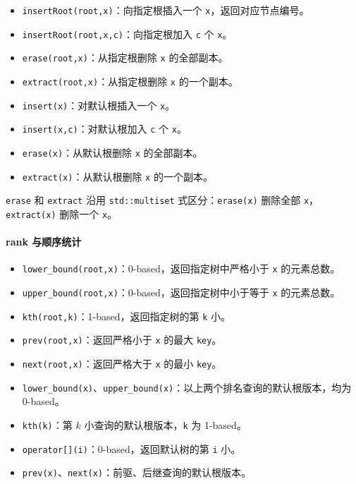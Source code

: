 \begin{itemize}
  \item \texttt{insertRoot(root,x)}：向指定根插入一个 \texttt{x}，返回对应节点编号。
  \item \texttt{insertRoot(root,x,c)}：向指定根加入 \texttt{c} 个 \texttt{x}。
  \item \texttt{erase(root,x)}：从指定根删除 \texttt{x} 的全部副本。
  \item \texttt{extract(root,x)}：从指定根删除 \texttt{x} 的一个副本。
  \item \texttt{insert(x)}：对默认根插入一个 \texttt{x}。
  \item \texttt{insert(x,c)}：对默认根加入 \texttt{c} 个 \texttt{x}。
  \item \texttt{erase(x)}：从默认根删除 \texttt{x} 的全部副本。
  \item \texttt{extract(x)}：从默认根删除 \texttt{x} 的一个副本。
\end{itemize}

\texttt{erase} 和 \texttt{extract} 沿用 \texttt{std::multiset} 式区分：\texttt{erase(x)} 删除全部 \texttt{x}，\texttt{extract(x)} 删除一个 \texttt{x}。

\paragraph*{rank 与顺序统计}

\begin{itemize}
  \item \texttt{lower\_bound(root,x)}：0-based，返回指定树中严格小于 \texttt{x} 的元素总数。
  \item \texttt{upper\_bound(root,x)}：0-based，返回指定树中小于等于 \texttt{x} 的元素总数。
  \item \texttt{kth(root,k)}：1-based，返回指定树的第 \texttt{k} 小。
  \item \texttt{prev(root,x)}：返回严格小于 \texttt{x} 的最大 \texttt{key}。
  \item \texttt{next(root,x)}：返回严格大于 \texttt{x} 的最小 \texttt{key}。
  \item \texttt{lower\_bound(x)}、\texttt{upper\_bound(x)}：以上两个排名查询的默认根版本，均为 0-based。
  \item \texttt{kth(k)}：第 $k$ 小查询的默认根版本，\texttt{k} 为 1-based。
  \item \texttt{operator[](i)}：0-based，返回默认树的第 \texttt{i} 小。
  \item \texttt{prev(x)}、\texttt{next(x)}：前驱、后继查询的默认根版本。
\end{itemize}

